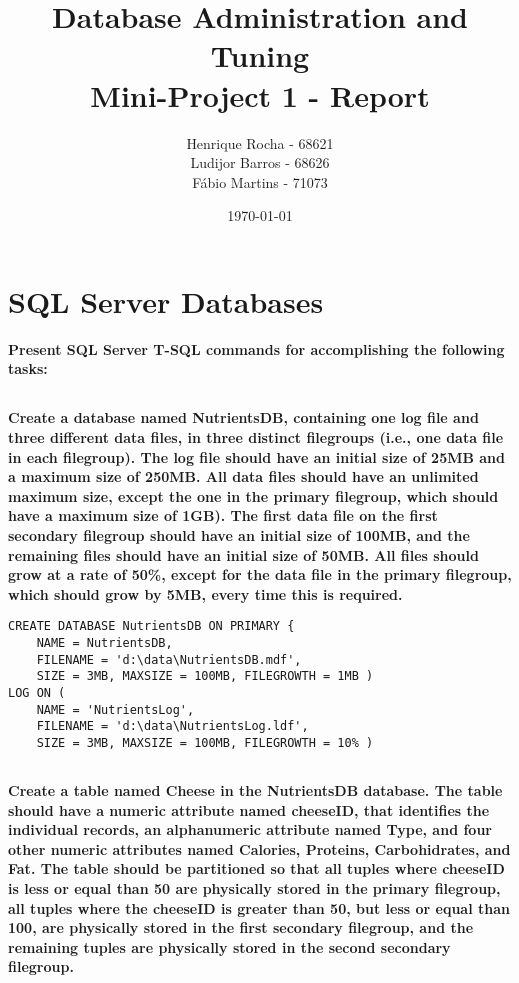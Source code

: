 \documentclass[11pt,report]{article}
\title{	Database Administration and Tuning \\ Mini-Project 1 - Report}
\author{
	Henrique Rocha - 68621 \\
	Ludijor Barros - 68626 \\
	Fábio Martins - 71073
}
\date{\today}
\begin{document}
	\maketitle
\section{SQL Server Databases}
	\textbf{Present SQL Server T-SQL commands for accomplishing the following tasks:}
	\subsection{}
	\textbf{Create a database named NutrientsDB, containing one log file and three different data files, in three distinct filegroups (i.e., one data file in each filegroup). The log file should have an initial size of 25MB and a maximum size of 250MB. All data files should have an unlimited maximum size, except the one in the primary filegroup, which should have a maximum size of 1GB). The first data file on the first secondary filegroup should have an initial size of 100MB, and the remaining files should have an initial size of 50MB. All files should grow at a rate of 50\%, except for the data file in the primary filegroup, which should grow by 5MB, every time this is required.}

\begin{lstlisting}
CREATE DATABASE NutrientsDB ON PRIMARY {
	NAME = NutrientsDB,
	FILENAME = 'd:\data\NutrientsDB.mdf',
	SIZE = 3MB, MAXSIZE = 100MB, FILEGROWTH = 1MB )
LOG ON (
	NAME = 'NutrientsLog',
	FILENAME = 'd:\data\NutrientsLog.ldf',
	SIZE = 3MB, MAXSIZE = 100MB, FILEGROWTH = 10% )
\end{lstlisting}

	\subsection{}
	\textbf{Create a table named Cheese in the NutrientsDB database. The table should have a numeric attribute named cheeseID, that identifies the individual records, an alphanumeric attribute named Type, and four other numeric attributes named Calories, Proteins, Carbohidrates, and Fat. The table should be partitioned so that all tuples where cheeseID is less or equal than 50 are physically stored in the primary filegroup, all tuples where the cheeseID is greater than 50, but less or equal than 100, are physically stored in the first secondary filegroup, and the remaining tuples are physically stored in the second secondary filegroup.}
\end{document}
